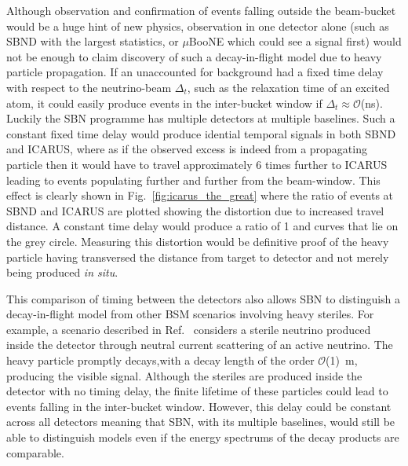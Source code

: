 \documentclass[11pt, a4paper]{article}
\newcommand{\reffig}[1]{Fig.~\ref{#1}}
\newcommand{\refref}[1]{Ref.~\cite{#1}}
\begin{document}
Although observation and confirmation of events falling outside the beam-bucket
would be a huge hint of new physics, observation in one detector alone (such as
SBND with the largest statistics, or $\mu$BooNE which could see a signal first)
would not be enough to claim discovery of such a decay-in-flight model due to
heavy particle propagation. If an unaccounted for background had a fixed time
delay with respect to the neutrino-beam $\Delta_t$, such as the relaxation time
of an excited atom, it could easily produce events in the inter-bucket window
if $\Delta_t \approx \mathcal{O}$(ns). Luckily the SBN programme has multiple
detectors at multiple baselines. Such a constant fixed time delay would produce
idential temporal signals in both SBND and ICARUS, where as if the observed
excess is indeed from a propagating particle then it would have to travel
approximately 6 times further to ICARUS leading to events populating further
and further from the beam-window. This effect is clearly shown in
\reffig{fig:icarus_the_great} where the ratio of events at SBND and ICARUS are
plotted showing the distortion due to increased travel distance. A constant
time delay would produce a ratio of 1 and curves that lie on the grey circle.
Measuring this distortion would be definitive proof of the heavy particle
having transversed the distance from target to detector and not merely being
produced \emph{in situ}.

This comparison of timing between the detectors also allows SBN to distinguish
a decay-in-flight model from other BSM scenarios involving heavy steriles. For
example, a scenario described in \refref{Gninenko:2009ks,Gninenko:2010pr}
considers a sterile neutrino produced inside the detector through neutral
current scattering of an active neutrino. The heavy particle promptly
decays,with a decay length of the order $\mathcal{O}$(1)~m, producing the
visible signal. Although the steriles are produced inside the detector with no
timing delay, the finite lifetime of these particles could lead to events
falling in the inter-bucket window. However, this delay could be constant
across all detectors meaning that SBN, with its multiple baselines, would still
be able to distinguish models even if the energy spectrums of the decay
products are comparable.
\end{document}
